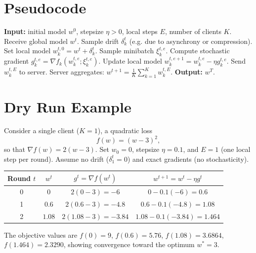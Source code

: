 \documentclass{article}
\begin{document}
\section*{Pseudocode}
\begin{algorithm}[H]
\caption{Federated Averaging (Local SGD) with Drift}
\begin{algorithmic}[1]
\STATE \textbf{Input:} initial model $w^{0}$, stepsize $\eta>0$, local steps $E$, number of clients $K$.
        \STATE Receive global model $w^{t}$.
        \STATE Sample drift $\delta_{k}^{t}$ (e.g. due to asynchrony or compression).
        \STATE Set local model $w_{k}^{t,0}=w^{t}+\delta_{k}^{t}$.
            \STATE Sample minibatch $\xi_{k}^{t,e}$.
            \STATE Compute stochastic gradient $g_{k}^{t,e}= \nabla f_{k}(w_{k}^{t,e};\xi_{k}^{t,e})$.
            \STATE Update local model $w_{k}^{t,e+1}= w_{k}^{t,e}-\eta g_{k}^{t,e}$.
        \ENDFOR
        \STATE Send $w_{k}^{t,E}$ to server.
    \ENDFOR
    \STATE Server aggregates: $w^{t+1}= \frac{1}{K}\sum_{k=1}^{K} w_{k}^{t,E}$.
\ENDFOR
\STATE \textbf{Output:} $w^{T}$.
\end{algorithmic}
\end{algorithm}

\section*{Dry Run Example}
Consider a single client ($K=1$), a quadratic loss
\[
    f(w)= (w-3)^{2},
\]
so that $\nabla f(w)=2(w-3)$.  Set $w_{0}=0$, stepsize $\eta=0.1$, and $E=1$ (one local step per round).  Assume no drift ($\delta_{1}^{t}=0$) and exact gradients (no stochasticity).

\begin{center}
\begin{tabular}{c|c|c|c}
\textbf{Round $t$} & $w^{t}$ & $g^{t}= \nabla f(w^{t})$ & $w^{t+1}= w^{t}-\eta g^{t}$ \\ \hline
0 & $0$ & $2(0-3)=-6$ & $0-0.1(-6)=0.6$ \\
1 & $0.6$ & $2(0.6-3)=-4.8$ & $0.6-0.1(-4.8)=1.08$ \\
2 & $1.08$ & $2(1.08-3)=-3.84$ & $1.08-0.1(-3.84)=1.464$ \\
\end{tabular}
\end{center}
The objective values are $f(0)=9$, $f(0.6)=5.76$, $f(1.08)=3.6864$, $f(1.464)=2.3290$, showing convergence toward the optimum $w^{*}=3$.
\end{document}
